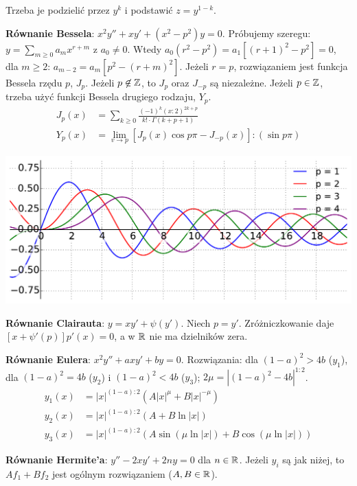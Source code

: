 \begin{multicols*}{2}
\begin{enumx}
Trzeba je podzielić przez $y^k$ i podstawić $z = y^{1 - k}$.
\item \textbf{Równanie Bessela}: $x^2 y'' + xy' + (x^2 - p^2) y = 0$.
Próbujemy szeregu: $y = \sum_{m \ge 0} a_m x^{r+m}$ z $a_0 \neq 0$.
Wtedy $a_0(r^2 - p^2) = a_1 [(r+1)^2 - p^2] = 0$, dla $m \ge 2$: $a_{m-2} = a_m[p^2 - (r+m)^2]$.
Jeżeli $r = p$, rozwiązaniem jest funkcja Bessela rzędu $p$, $J_p$.
Jeżeli $p \not \in \mathbb{Z}$, to $J_p$ oraz $J_{-p}$ są niezależne.
Jeżeli $p \in \mathbb{Z}$, trzeba użyć funkcji Bessela drugiego rodzaju, $Y_p$.
\begin{align*}
J_p(x) & = \sum_{k \ge 0} \frac{(-1)^k (x : 2)^{2k+p}}{k! \cdot \Gamma(k + p + 1)} \\
Y_p(x) & = \lim_{v \to p} [J_p(x) \cos p \pi - J_{-p}(x)] : (\sin p \pi)
\end{align*}
\end{enumx}
\begin{center}
	\includegraphics[width=0.9\columnwidth]{bessel.pdf}
\end{center}
\begin{enumx}
\item \textbf{Równanie Clairauta}: $y = xy' + \psi(y')$.
Niech $p = y'$. Zróżniczkowanie daje $[x + \psi'(p)] p'(x) = 0$, a w $\mathbb{R}$ nie ma dzielników zera.
\item \textbf{Równanie Eulera}: $x^2 y'' + axy' + by = 0$. Rozwiązania: dla $(1-a)^2 > 4b$ ($y_1$), dla $(1-a)^2 = 4b$ ($y_2$) i $(1-a)^2 < 4b$ ($y_3$); $2 \mu = |(1-a)^2 - 4b|^{1:2}$.
\begin{align*}
y_1(x) & = |x|^{(1-a):2} (A |x|^\mu + B |x|^{- \mu}) \\
y_2(x) & = |x|^{(1-a):2} (A + B  \ln |x|) \\
y_3(x) & = |x|^{(1-a):2} (A \sin (\mu \ln |x|) + B \cos (\mu \ln |x|)) 
\end{align*}
\item \textbf{Równanie Hermite'a}: $y'' - 2 x y' + 2 ny = 0$ dla $n \in \mathbb{R}$.
Jeżeli $y_i$ są jak niżej, to $Af_1 + Bf_2$ jest ogólnym rozwiązaniem ($A, B \in \mathbb{R}$).

\end{enumx}
\end{multicols*}
